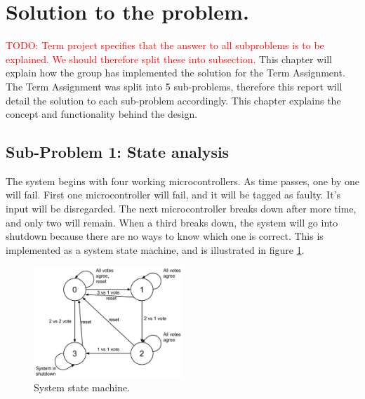 \documentclass[a4paper]{IEEEtran}
\newcommand\TODO[1]{\textcolor{red}{TODO:#1}}
\newcommand\todo[1]{\TODO{#1}}
\begin{document}
\section{ Solution to the problem.}
\todo{ Term project specifies that the answer to all subproblems is to be explained. We should therefore split these into subsection. }
This chapter will explain how the group has implemented the solution for the Term Assignment.
The Term Assignment was split into 5 sub-problems, therefore this report will detail the solution to each sub-problem accordingly.
This chapter explains the concept and functionality behind the design.

\subsection{Sub-Problem 1: State analysis}

The system begins with four working microcontrollers.
As time passes, one by one will fail.
First one microcontroller will fail, and it will be tagged as faulty.
It's input will be disregarded.
The next microcontroller breaks down after more time, and only two will remain.
When a third breaks down, the system will go into shutdown because there are no ways to know which one is correct.
This is implemented as a system state machine, and is illustrated in figure \ref{fig:StateMachine}.
\begin{figure}[h!]
    \centering
    \includegraphics[width=0.5\textwidth]{Figures/Solution/StateMachine}
    \caption{System state machine.}
    \label{fig:StateMachine}
\end{figure}
\end{document}
